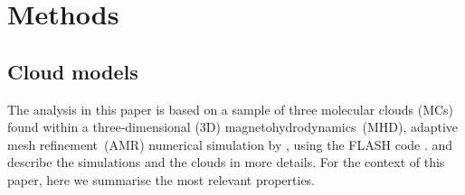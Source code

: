 \section{Methods}\label{methods}


\subsection{Cloud models}\label{methods:clouds}


The analysis in this paper is based on a sample of three molecular clouds (MCs) found within a three-dimensional (3D) magnetohydrodynamics~(MHD), adaptive mesh refinement~(AMR) numerical simulation by \citet{IbanezMejia2016}, using the FLASH code \citep{Fryxell2000}.
\citet[hereafter  and , respectively]{IbanezMejia2016,IbanezMejia2017} and \citet[hereafter ]{Chira2018} describe the simulations and the clouds in more details. 
For the context of this paper, here we summarise the most relevant properties. 

